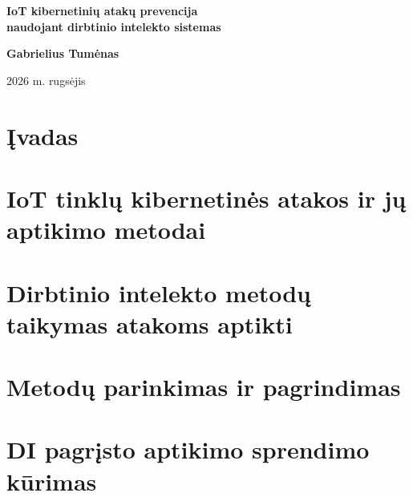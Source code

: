 \documentclass[11pt,a4paper]{article}
\begin{document}
\begin{titlepage}
\centering
\vspace*{3.5cm}

{\huge\bfseries IoT kibernetinių atakų prevencija\\[6pt] naudojant dirbtinio intelekto sistemas\par}

\vfill

{\Large\bfseries Gabrielius Tumėnas\par}

\vspace{2cm}
{\large 2026 m. rugsėjis\par}

\vspace{2cm}
\end{titlepage}

\tableofcontents
\newpage


\section{Įvadas}


\section{IoT tinklų kibernetinės atakos ir jų aptikimo metodai}
\label{sec:atakos}


\section{Dirbtinio intelekto metodų taikymas atakoms aptikti}
\label{sec:di_metodai}


\section{Metodų parinkimas ir pagrindimas}
\label{sec:parinkimas}


\section{DI pagrįsto aptikimo sprendimo kūrimas}
\label{sec:sprendimas}

\end{document}
